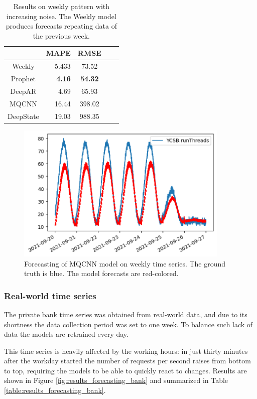 \documentclass[a4paper, 12pt]{article} %
\newcommand{\ra}[1]{\renewcommand{\arraystretch}{#1}}
\begin{document}
	\begin{table}\centering 
		\ra{1.3}
		\begin{tabular}{@{}crcrc@{}}
			\midrule
			& MAPE & RMSE\\
			\midrule
			Weekly & 5.433 & 73.52\\
			Prophet & \textbf{4.16} & \textbf{54.32}\\
			DeepAR & 4.69 & 65.93\\
			MQCNN & 16.44 & 398.02\\
			DeepState & 19.03 & 988.35\\
			\bottomrule
		\end{tabular}
		\caption{Results on weekly pattern with increasing noise. The Weekly model produces forecasts repeating data of the previous week.} \label{table:results_forecasting_weekly}
	\end{table}

	\begin{figure} \centering
		\includegraphics[width=4in]{img/results_forecasting_weekly_mqcnn.png}
		\caption{Forecasting of MQCNN model on weekly time series. The ground truth is blue. The model forecasts are red-colored. }
		\label{fig:results_forecasting_weekly_mqcnn}
	\end{figure}
	
	\clearpage
	\subsubsection{Real-world time series} \label{sssec:results_forecasting_bank}
	The private bank time series was obtained from real-world data, and due to its shortness the data collection period was set to one week. To balance such lack of data the models are retrained every day. 
	
	This time series is heavily affected by the working hours: in just thirty minutes after the workday started the number of requests per second raises from bottom to top, requiring the models to be able to quickly react to changes. Results are shown in Figure \ref{fig:results_forecasting_bank} and summarized in Table \ref{table:results_forecasting_bank}. 
	
\end{document}

